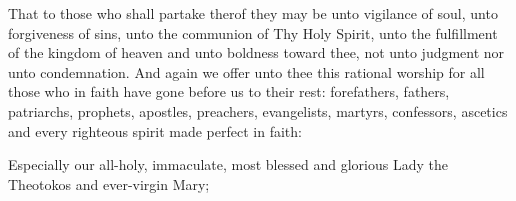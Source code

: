 \documentclass[twoside, letterpaper, 12pt]{report}
\begin{document}
\cleardoublepage
{}
\begin{priest}
\item That to those who shall partake therof they may be unto vigilance of soul,
  unto forgiveness of sins, unto the communion of Thy Holy Spirit,
  unto the fulfillment of the kingdom of heaven and unto boldness toward thee,
  not unto judgment nor unto condemnation.
  And again we offer unto thee this rational worship for all those who in faith
  have gone before us to their rest:
  forefathers, fathers, patriarchs, prophets, apostles, preachers, evangelists,
  martyrs, confessors, ascetics and every righteous spirit made perfect in faith:

\item Especially our all-holy, immaculate,
  most blessed and glorious Lady the Theotokos and ever-virgin Mary;
\end{priest}
\cleardoublepage



\end{document}
